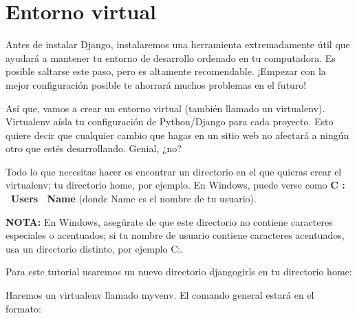 \documentclass[
  a4paper,
  DIV=11,
  numbers=noendperiod,
  onepage,
  openany]{scrreprt}
\newenvironment{Shaded}{\begin{snugshade}}{\end{snugshade}}
\newcommand{\ExtensionTok}[1]{\textcolor[rgb]{0.00,0.23,0.31}{#1}}
\newcommand{\NormalTok}[1]{\textcolor[rgb]{0.00,0.23,0.31}{#1}}
\begin{document}
\chapter{Entorno virtual}\label{entorno-virtual-1}

Antes de instalar Django, instalaremos una herramienta extremadamente
útil que ayudará a mantener tu entorno de desarrollo ordenado en tu
computadora. Es posible saltarse este paso, pero es altamente
recomendable. ¡Empezar con la mejor configuración posible te ahorrará
muchos problemas en el futuro!

Así que, vamos a crear un entorno virtual (también llamado un
virtualenv). Virtualenv aísla tu configuración de Python/Django para
cada proyecto. Esto quiere decir que cualquier cambio que hagas en un
sitio web no afectará a ningún otro que estés desarrollando. Genial,
¿no?

Todo lo que necesitas hacer es encontrar un directorio en el que quieras
crear el virtualenv; tu directorio home, por ejemplo. En Windows, puede
verse como \textbf{C : ~Users ~Name} (donde Name es el nombre de tu
usuario).

\begin{tcolorbox}[enhanced jigsaw, colbacktitle=quarto-callout-tip-color!10!white, colback=white, breakable, bottomrule=.15mm, opacityback=0, colframe=quarto-callout-tip-color-frame, toprule=.15mm, leftrule=.75mm, coltitle=black, bottomtitle=1mm, rightrule=.15mm, opacitybacktitle=0.6, toptitle=1mm, titlerule=0mm, left=2mm, arc=.35mm, title=\textcolor{quarto-callout-tip-color}{\faLightbulb}\hspace{0.5em}{Tip}]

\textbf{NOTA:} En Windows, asegúrate de que este directorio no contiene
caracteres especiales o acentuados; si tu nombre de usuario contiene
caracteres acentuados, usa un directorio distinto, por ejemplo
C:\djangogirls.

\end{tcolorbox}

Para este tutorial usaremos un nuevo directorio djangogirls en tu
directorio home:

\begin{Shaded}
\end{Shaded}

Haremos un virtualenv llamado myvenv. El comando general estará en el
formato:
\end{document}
